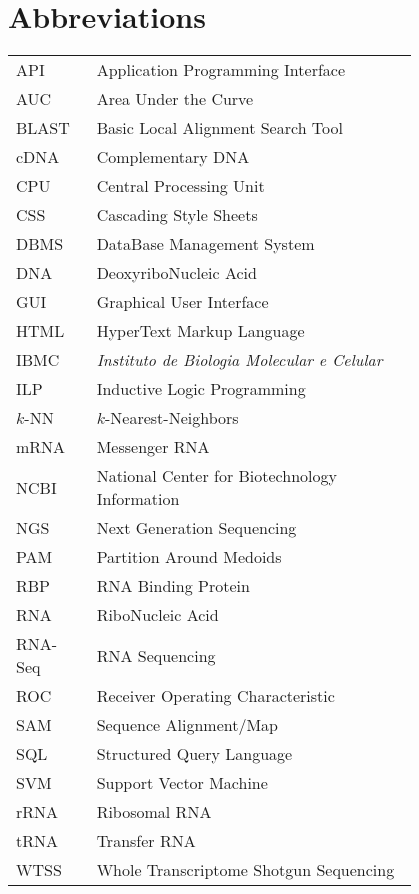 \chapter*{Abbreviations}

\begin{flushleft}
\begin{tabular}{l p{0.8\linewidth}}
API       & Application Programming Interface\\
AUC       & Area Under the Curve\\
BLAST     & Basic Local Alignment Search Tool\\
cDNA      & Complementary DNA\\
CPU       & Central Processing Unit\\
CSS       & Cascading Style Sheets\\
DBMS      & DataBase Management System\\
DNA       & DeoxyriboNucleic Acid\\
GUI       & Graphical User Interface\\
HTML      & HyperText Markup Language\\
IBMC      & \textit{Instituto de Biologia Molecular e Celular}\\
ILP       & Inductive Logic Programming\\
$k$-NN      & $k$-Nearest-Neighbors\\
mRNA      & Messenger RNA\\
NCBI      & National Center for Biotechnology Information\\
NGS       & Next Generation Sequencing\\
PAM       & Partition Around Medoids\\
RBP       & RNA Binding Protein\\
RNA       & RiboNucleic Acid\\
RNA-Seq   & RNA Sequencing\\
ROC       & Receiver Operating Characteristic\\
SAM       & Sequence Alignment/Map\\
SQL       & Structured Query Language\\
SVM       & Support Vector Machine\\
rRNA      & Ribosomal RNA\\
tRNA      & Transfer RNA\\
WTSS      & Whole Transcriptome Shotgun Sequencing\\
\end{tabular}
\end{flushleft}

